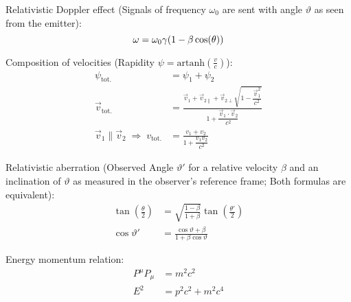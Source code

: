 			\noindent
			Relativistic Doppler effect (Signals of frequency $\omega_0$ are sent with angle $\vartheta$ as seen from the emitter):
			\begin{equation}
				\omega = \omega_0 \gamma \qty(1-\beta\cos(\theta))
			\end{equation}

			\noindent
			Composition of velocities (Rapidity $\psi = \mathrm{artanh}\left(\frac{v}{c}\right)$):
			\begin{equation}
				\begin{aligned}
					\psi_{\text{tot.}} &= \psi_1+\psi_2 \\
					\vec{v}_{\text{tot.}} &= \frac{\vec{v}_1+\vec{v}_{2\parallel}+\vec{v}_{2\perp}\sqrt{1-\dfrac{\vec{v}_1^2}{c^2}}}{1+\dfrac{\vec{v}_1\cdot\vec{v}_2}{c^2}} \\
					\vec{v}_1\parallel\vec{v}_2 \;\Rightarrow\; v_{\text{tot.}} &= \frac{v_1+v_2}{1+\dfrac{v_1 v_2}{c^2}}
				\end{aligned}
			\end{equation}

			\noindent
			Relativistic aberration (Observed Angle $\vartheta'$ for a relative velocity $\beta$ and an inclination of $\vartheta$ as measured in the observer's reference frame; Both formulas are equivalent):
			\begin{equation}
				\begin{aligned}
					\tan\left(\frac{\theta}{2}\right) &= \sqrt{\frac{1-\beta}{1+\beta}}\tan\left(\frac{\theta'}{2}\right)\\
					\cos\vartheta' &= \frac{\cos\vartheta+\beta}{1+\beta\cos\vartheta}
				\end{aligned}
			\end{equation}

			\noindent
			Energy momentum relation:
			\begin{equation}
				\begin{aligned}
					P^\mu P_\mu &= m^2 c^2\\
					E^2 &= p^2 c^2 + m^2 c^4 \\
				\end{aligned}
			\end{equation}
			\newpage
